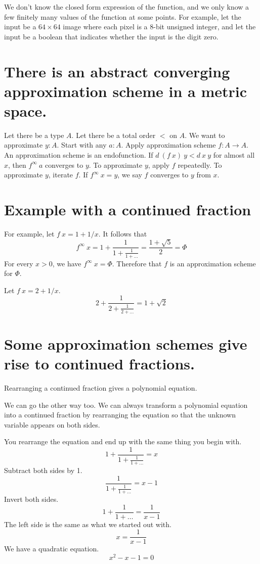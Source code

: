 We don't know the closed form expression of the function,
and we only know a few finitely many values of the function at some points.
For example, let the input be a \(64 \times 64\) image
where each pixel is a 8-bit unsigned integer,
and let the input be a boolean that indicates
whether the input is the digit zero.

\section{There is an abstract converging approximation scheme in a metric space.}

Let there be a type \(A\).
Let there be a total order \(<\) on \(A\).
We want to approximate \(y : A\).
Start with any \(a : A\).
Apply approximation scheme \(f : A \to A\).
An approximation scheme is an endofunction.
If \(d~(f~x)~y < d~x~y\) for almost all \(x\), then \(f^\infty~a\) converges to \(y\).
To approximate \(y\), apply \(f\) repeatedly.
To approximate \(y\), iterate \(f\).
If \( f^\infty~x = y \), we say \(f\) converges to \(y\) from \(x\).

\section{Example with a continued fraction}

For example, let \(f~x = 1 + 1/x\).
It follows that
\[
    f^\infty~x = 1 + \frac{1}{1 + \frac{1}{1 + \ldots}} = \frac{1 + \sqrt{5}}{2} = \Phi
\]
For every \(x > 0\), we have \(f^\infty~x = \Phi\).
Therefore that \(f\) is an approximation scheme for \(\Phi\).

Let \(f~x = 2 + 1/x\).
\[
    2 + \frac{1}{2 + \frac{1}{2 + \ldots}} = 1 + \sqrt{2}
\]

\section{Some approximation schemes give rise to continued fractions.}

Rearranging a continued fraction gives a polynomial equation.

We can go the other way too.
We can always transform a polynomial equation into a continued fraction
by rearranging the equation so that the unknown variable appears on both sides.

You rearrange the equation and end up with the same thing you begin with.
\[
    1 + \frac{1}{1 + \frac{1}{1 + \ldots}} = x
\]
Subtract both sides by 1.
\[
    \frac{1}{1 + \frac{1}{1 + \ldots}} = x - 1
\]
Invert both sides.
\[
    1 + \frac{1}{1 + \ldots} = \frac{1}{x - 1}
\]
The left side is the same as what we started out with.
\[
    x = \frac{1}{x - 1}
\]
We have a quadratic equation.
\[
    x^2 - x - 1 = 0
\]

